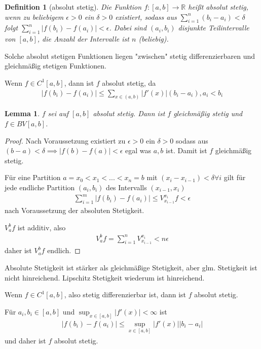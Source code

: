 \documentclass[]{article}
\newtheorem{lemma}{Lemma}
\newtheorem{definition}{Definition}
\begin{document}
\begin{definition}[absolut stetig]
	Die Funktion $f:[a,b] \rightarrow \mathbb{R}$ heißt absolut stetig, wenn zu beliebigem $\epsilon>0$ ein $\delta > 0$ existiert, sodass aus $\sum_{i=1}^{n} (b_i - a_i) < \delta$ folgt $\sum_{i=1}^{n} |f(b_i) - f(a_i)| < \epsilon$. Dabei sind $(a_i,b_i)$ disjunkte Teilintervalle von $[a,b]$, die Anzahl der Intervalle ist $n$ (beliebig).
\end{definition}

Solche absolut stetigen Funktionen liegen "zwischen" stetig differenzierbaren und gleichmäßig stetigen Funktionen.

Wenn $f\in C^1[a,b]$, dann ist $f$ absolut stetig, da
\begin{align*}
	|f(b_i) - f(a_i)| \leq \sum_{x\in (a,b)} |f'(x)| (b_i - a_i), a_i < b_i
\end{align*}

\begin{lemma}
	$f$ sei auf $[a,b]$ absolut stetig. Dann ist $f$ gleichmäßig stetig und $f\in BV[a,b]$.
\end{lemma}
\begin{proof}
	Nach Voraussetzung existiert zu $\epsilon > 0$ ein $\delta > 0$ sodass aus $(b-a)< \delta \implies |f(b)-f(a)| < \epsilon$ egal was $a,b$ ist. Damit ist $f$ gleichmäßig stetig.
	
	Für eine Partition $a=x_0 < x_1 < ... < x_n = b$ mit $(x_i - x_{i-1}) < \delta \forall i$ gilt für jede endliche Partition $(a_i,b_i)$ des Intervalls $(x_{i-1},x_i)$
	\begin{align*}
		\sum_{i=1}^{m} |f(b_i) - f(a_i)| \leq V_{x_{i-1}}^{x_i} f < \epsilon
	\end{align*}
	nach Voraussetzung der absoluten Stetigkeit.
	
	$V_a^b f$ ist additiv, also
	\begin{align*}
		V_a^b f = \sum_{i=1}^{n} V_{x_{i-1}}^{x_i} < n \epsilon
	\end{align*}
	daher ist $V_a^b f$ endlich.
\end{proof}

Absolute Stetigkeit ist stärker als gleichmäßige Stetigkeit, aber glm. Stetigkeit ist nicht hinreichend. Lipschitz Stetigkeit wiederum ist hinreichend.

Wenn $f \in C^1[a,b]$, also stetig differenzierbar ist, dann ist $f$ absolut stetig.

Für $a_i, b_i \in [a,b]$ und $\sup_{x \in [a,b]} |f'(x)| < \infty$ ist
\begin{align*}
	|f(b_i) - f(a_i)| \leq \sup_{x \in [a,b]} |f'(x)| |b_i - a_i|
\end{align*}
und daher ist $f$ absolut stetig.
\end{document}
